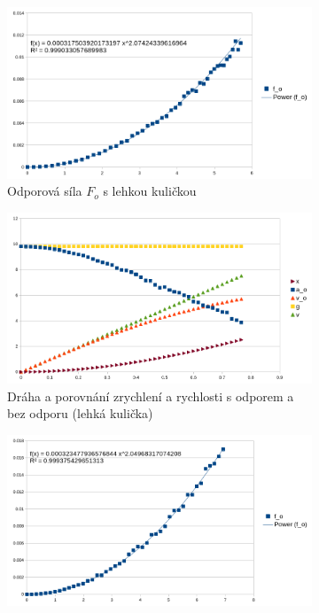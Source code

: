 \documentclass{fkssolpub}
\begin{document}
\begin{figure}[h!]
	\caption{Grafy}
	\begin{subfigure}[b]{0.5\textwidth}
		\centering
		\includegraphics[width=\textwidth]{6-fig1.png}
		\caption{Odporová síla $F_o$ s lehkou kuličkou}
		\label{fig:a}
	\end{subfigure}
	\begin{subfigure}[b]{0.5\textwidth}
		\centering
		\includegraphics[width=\textwidth]{6-fig2.png}
		\caption{Dráha a porovnání zrychlení a rychlosti s odporem a bez odporu (lehká kulička)}
		\label{fig:b}
	\end{subfigure}
	\begin{subfigure}[b]{0.5\textwidth}
		\centering
		\includegraphics[width=\textwidth]{6-fig3.png}

\end{subfigure}
\end{figure}
\end{document}
